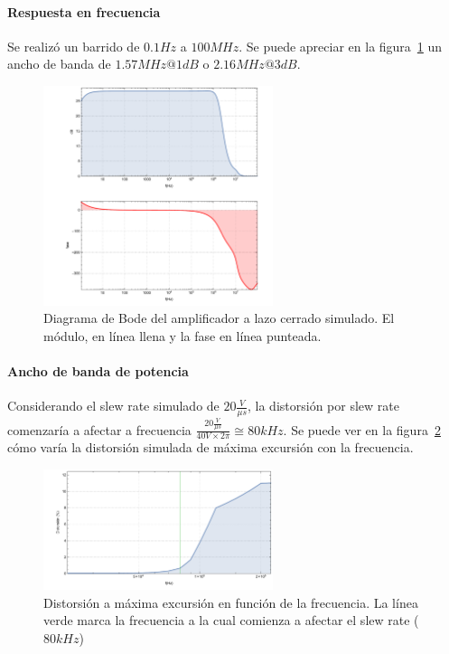 \documentclass[a4paper,12pt,twoside]{article}
\begin{document}

\paragraph{Respuesta en frecuencia} 

Se realizó un barrido de $0.1Hz$ a $100MHz$. Se puede apreciar en la figura~\ref{fig:bode} un ancho de banda de $1.57MHz@1dB$ o $2.16MHz@3dB$.

\begin{figure}[H]
	\centering
	\includegraphics[width=0.6\textwidth]{img/sim/bode}
	\caption{Diagrama de Bode del amplificador a lazo cerrado simulado. El módulo, en línea llena y la fase en línea punteada.}
	\label{fig:bode}
\end{figure}



\paragraph{Ancho de banda de potencia}

Considerando el slew rate simulado de $20\frac{V}{\mu s}$, la distorsión por slew rate comenzaría a afectar a frecuencia $\frac{20\frac{V}{\mu s}}{40V \times 2\pi}\cong 80kHz$. Se puede ver en la figura~\ref{fig:distorsion-frec} cómo varía la distorsión simulada de máxima excursión con la frecuencia.


\begin{figure}[H]
	\centering
	\includegraphics[width=0.6\textwidth]{img/sim/distorsion-frec}
	\caption{Distorsión a máxima excursión en función de la frecuencia. La línea verde marca la frecuencia a la cual comienza a afectar el slew rate ($80kHz$)}
	\label{fig:distorsion-frec}
\end{figure}
\end{document}

